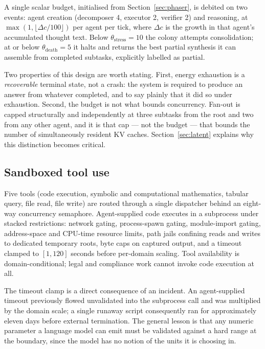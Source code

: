 \documentclass[11pt]{article}
\begin{document}
A single scalar budget, initialised from Section~\ref{sec:phaser}, is debited
on two events: agent creation (decomposer 4, executor 2, verifier 2) and
reasoning, at $\max(1, \lfloor \Delta c / 100 \rfloor)$ per agent per tick,
where $\Delta c$ is the growth in that agent's accumulated thought text. Below
$\theta_{\text{stress}} = 10$ the colony attempts consolidation; at or below
$\theta_{\text{death}} = 5$ it halts and returns the best partial synthesis it
can assemble from completed subtasks, explicitly labelled as partial.

Two properties of this design are worth stating. First, energy exhaustion is a
\emph{recoverable} terminal state, not a crash: the system is required to
produce an answer from whatever completed, and to say plainly that it did so
under exhaustion. Second, the budget is not what bounds concurrency. Fan-out is
capped structurally and independently at three subtasks from the root and two
from any other agent, and it is that cap --- not the budget --- that bounds the
number of simultaneously resident KV caches. Section~\ref{sec:latent} explains
why this distinction becomes critical.

\subsection{Sandboxed tool use}
\label{sec:tools}

Five tools (code execution, symbolic and computational mathematics, tabular
query, file read, file write) are routed through a single dispatcher behind an
eight-way concurrency semaphore. Agent-supplied code executes in a subprocess
under stacked restrictions: network gating, process-spawn gating, module-import
gating, address-space and CPU-time resource limits, path jails confining reads
and writes to dedicated temporary roots, byte caps on captured output, and a
timeout clamped to $[1, 120]$ seconds before per-domain scaling. Tool
availability is domain-conditional; legal and compliance work cannot invoke
code execution at all.

The timeout clamp is a direct consequence of an incident. An agent-supplied
timeout previously flowed unvalidated into the subprocess call and was
multiplied by the domain scale; a single runaway script consequently ran for
approximately eleven days before external termination. The general lesson is
that any numeric parameter a language model can emit must be validated against
a hard range at the boundary, since the model has no notion of the units it is
choosing in.
\end{document}
